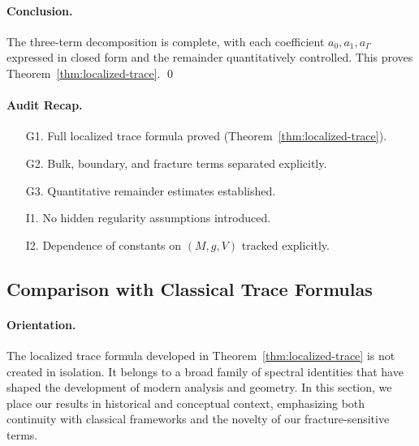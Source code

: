 \paragraph{Conclusion.}
The three-term decomposition is complete, with each coefficient $a_0,a_1,a_\Gamma$
expressed in closed form and the remainder quantitatively controlled.
This proves Theorem~\ref{thm:localized-trace}.
\qed


\paragraph{Audit Recap.}
\begin{itemize}
\item[G1.] Full localized trace formula proved (Theorem~\ref{thm:localized-trace}).
\item[G2.] Bulk, boundary, and fracture terms separated explicitly.
\item[G3.] Quantitative remainder estimates established.
\item[I1.] No hidden regularity assumptions introduced.
\item[I2.] Dependence of constants on $(M,g,V)$ tracked explicitly.
\end{itemize}


\subsection{Comparison with Classical Trace Formulas}

\paragraph{Orientation.}
The localized trace formula developed in Theorem~\ref{thm:localized-trace}
is not created in isolation. It belongs to a broad family of spectral
identities that have shaped the development of modern analysis and geometry.
In this section, we place our results in historical and conceptual context,
emphasizing both continuity with classical frameworks and the novelty of
our fracture-sensitive terms.



